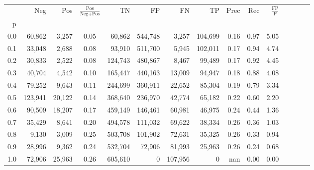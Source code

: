 \begin{tabular}{rrrcrrrrrrrrrrr}
\toprule
{} &      Neg &     Pos & $\frac{\text{Pos}}{\text{Neg}+\text{Pos}}$ &       TN &       FP &       FN &       TP &  Prec &   Rec & $\frac{\text{FP}}{\text{P}}$ \\
p   &          &         &                                            &          &          &          &          &       &       &                              \\
\midrule
0.0 &   60,862 &   3,257 &                                       0.05 &   60,862 &  544,748 &    3,257 &  104,699 &  0.16 &  0.97 &                         5.05 \\
0.1 &   33,048 &   2,688 &                                       0.08 &   93,910 &  511,700 &    5,945 &  102,011 &  0.17 &  0.94 &                         4.74 \\
0.2 &   30,833 &   2,522 &                                       0.08 &  124,743 &  480,867 &    8,467 &   99,489 &  0.17 &  0.92 &                         4.45 \\
0.3 &   40,704 &   4,542 &                                       0.10 &  165,447 &  440,163 &   13,009 &   94,947 &  0.18 &  0.88 &                         4.08 \\
0.4 &   79,252 &   9,643 &                                       0.11 &  244,699 &  360,911 &   22,652 &   85,304 &  0.19 &  0.79 &                         3.34 \\
0.5 &  123,941 &  20,122 &                                       0.14 &  368,640 &  236,970 &   42,774 &   65,182 &  0.22 &  0.60 &                         2.20 \\
0.6 &   90,509 &  18,207 &                                       0.17 &  459,149 &  146,461 &   60,981 &   46,975 &  0.24 &  0.44 &                         1.36 \\
0.7 &   35,429 &   8,641 &                                       0.20 &  494,578 &  111,032 &   69,622 &   38,334 &  0.26 &  0.36 &                         1.03 \\
0.8 &    9,130 &   3,009 &                                       0.25 &  503,708 &  101,902 &   72,631 &   35,325 &  0.26 &  0.33 &                         0.94 \\
0.9 &   28,996 &   9,362 &                                       0.24 &  532,704 &   72,906 &   81,993 &   25,963 &  0.26 &  0.24 &                         0.68 \\
1.0 &   72,906 &  25,963 &                                       0.26 &  605,610 &        0 &  107,956 &        0 &   nan &  0.00 &                         0.00 \\
\bottomrule
\end{tabular}

